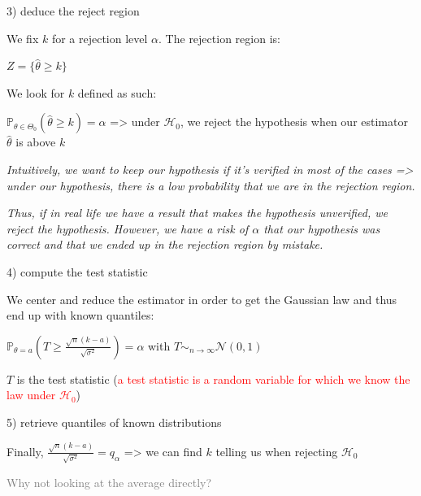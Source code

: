 \vspace{5mm}

3) deduce the reject region

\vspace{5mm}

We fix $k$ for a rejection level $\alpha$. The rejection region is:

$Z=\{\widehat{\theta} \ge k\}$

\vspace{5mm}

We look for $k$ defined as such:

$\mathbb{P}_{\theta \in \Theta_0}(\widehat{\theta} \ge k)=\alpha$ => under $\mathcal{H}_0$, we reject the hypothesis when our estimator $\widehat{\theta}$ is above $k$

\textit{Intuitively, we want to keep our hypothesis if it's verified in most of the cases => under our hypothesis, there is a low probability that we are in the rejection region.}

\textit{Thus, if in real life we have a result that makes the hypothesis unverified, we reject the hypothesis. However, we have a risk of $\alpha$ that our hypothesis was correct and that we ended up in the rejection region by mistake.}

\vspace{5mm}

4) compute the test statistic

\vspace{5mm}

We center and reduce the estimator in order to get the Gaussian law and thus end up with known quantiles:

$\mathbb{P}_{\theta = a}(T \ge \frac{\sqrt{n} (k-a)}{\sqrt{\sigma^2}})=\alpha$ with $T \sim_{n \to \infty} \mathcal{N}(0,1)$

$T$ is the test statistic (\textcolor{red}{a test statistic is a random variable for which we know the law under $\mathcal{H}_0$})

\vspace{5mm}

5) retrieve quantiles of known distributions

\vspace{5mm}

Finally, $\frac{\sqrt{n} (k-a)}{\sqrt{\sigma^2}}=q_\alpha$ => we can find $k$ telling us when rejecting $\mathcal{H}_0$

\vspace{5mm}

\textcolor{gray}{Why not looking at the average directly?}

